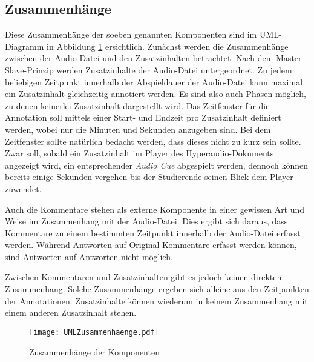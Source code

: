\subsection{Zusammenhänge}
\label{sec:komponenten_zusammenhaenge}
Diese Zusammenhänge der soeben genannten Komponenten sind im UML-Diagramm in Abbildung \ref{fig:UMLAufbau} ersichtlich. Zunächst werden die Zusammenhänge zwischen der Audio-Datei und den Zusatzinhalten betrachtet. Nach dem Master-Slave-Prinzip werden Zusatzinhalte der Audio-Datei untergeordnet. Zu jedem beliebigen Zeitpunkt innerhalb der Abspieldauer der Audio-Datei kann maximal ein Zusatzinhalt gleichzeitig annotiert werden. Es sind also auch Phasen möglich, zu denen keinerlei Zusatzinhalt dargestellt wird. Das Zeitfenster für die Annotation soll mittels einer Start- und Endzeit pro Zusatzinhalt definiert werden, wobei nur die Minuten und Sekunden anzugeben sind. Bei dem Zeitfenster sollte natürlich bedacht werden, dass dieses nicht zu kurz sein sollte. Zwar soll, sobald ein Zusatzinhalt im Player des Hyperaudio-Dokuments angezeigt wird, ein entsprechender \textit{Audio Cue} abgespielt werden, dennoch können bereits einige Sekunden vergehen bis der Studierende seinen Blick dem Player zuwendet.

Auch die Kommentare stehen als externe Komponente in einer gewissen Art und Weise im Zusammenhang mit der Audio-Datei. Dies ergibt sich daraus, dass Kommentare zu einem bestimmten Zeitpunkt innerhalb der Audio-Datei erfasst werden. Während Antworten auf Original-Kommentare erfasst werden können, sind Antworten auf Antworten nicht möglich.

Zwischen Kommentaren und Zusatzinhalten gibt es jedoch keinen direkten Zusammenhang. Solche Zusammenhänge ergeben sich alleine aus den Zeitpunkten der Annotationen. Zusatzinhalte können wiederum in keinem Zusammenhang mit einem anderen Zusatzinhalt stehen.


\begin{figure}[h!]
\texttt{[image: UMLZusammenhaenge.pdf]}
\caption{\label{fig:UMLAufbau}Zusammenhänge der Komponenten}
\end{figure}



